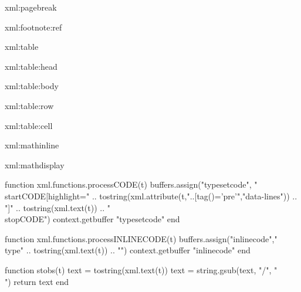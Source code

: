 \startxmlsetups xml:pagebreak
\stopxmlsetups

\startnotmode[nofootnotes]
\startxmlsetups xml:footnote:ref
\stopxmlsetups
\stopnotmode

\startxmlsetups xml:table
  \startembeddedxtable[option=stretch]
  \stopembeddedxtable
\stopxmlsetups

\startxmlsetups xml:table:head
  \startxtablehead
  \stopxtablehead
\stopxmlsetups

\startxmlsetups xml:table:body
  \startxtablebody
  \stopxtablebody
\stopxmlsetups

\startxmlsetups xml:table:row
  \startxrow
  \stopxrow
\stopxmlsetups

\startxmlsetups xml:table:cell
  {\startxcell[align={flushleft,lohi}]}
  {
    {\startxcell[align={middle,lohi}]}
    {\startxcell[align={flushright,lohi}]}}
  \stopxcell
\stopxmlsetups

\startxmlsetups xml:mathinline
\stopxmlsetups

\startxmlsetups xml:mathdisplay
  \startformula
  \stopformula
\stopxmlsetups

\usemodule[vim]
\setupvimtyping[vimcommand=vim]

\startluacode
    function xml.functions.processCODE(t)
        buffers.assign("typesetcode",
        "\\startCODE[highlight={" ..
          tostring(xml.attribute(t,"..[tag()='pre'","data-lines"))
              .. "}]\n" .. tostring(xml.text(t)) .. "\n\\stopCODE")
        context.getbuffer { "typesetcode" }
    end

    function xml.functions.processINLINECODE(t)
        buffers.assign("inlinecode","\\type{" .. tostring(xml.text(t)) .. "}")
        context.getbuffer { "inlinecode" }
    end
    
    function stobs(t)
      text = tostring(xml.text(t))
      text = string.gsub(text, "/", "\\")
      return text
    end
    

